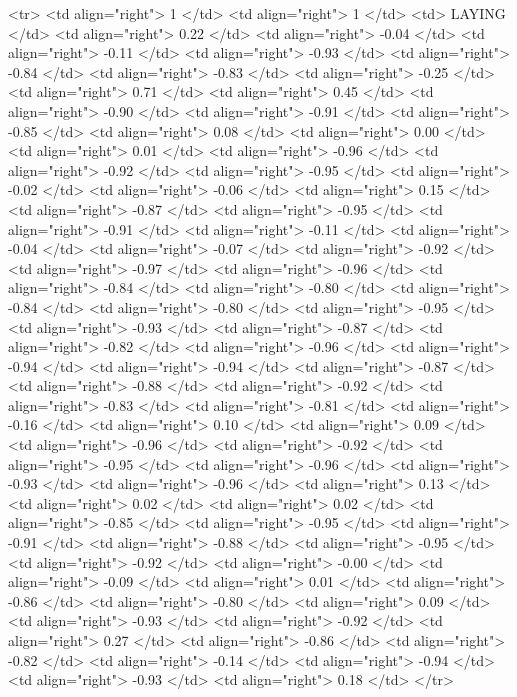  <tr> <td align="right"> 1 </td> <td align="right">   1 </td> <td> LAYING </td> <td align="right"> 0.22 </td> <td align="right"> -0.04 </td> <td align="right"> -0.11 </td> <td align="right"> -0.93 </td> <td align="right"> -0.84 </td> <td align="right"> -0.83 </td> <td align="right"> -0.25 </td> <td align="right"> 0.71 </td> <td align="right"> 0.45 </td> <td align="right"> -0.90 </td> <td align="right"> -0.91 </td> <td align="right"> -0.85 </td> <td align="right"> 0.08 </td> <td align="right"> 0.00 </td> <td align="right"> 0.01 </td> <td align="right"> -0.96 </td> <td align="right"> -0.92 </td> <td align="right"> -0.95 </td> <td align="right"> -0.02 </td> <td align="right"> -0.06 </td> <td align="right"> 0.15 </td> <td align="right"> -0.87 </td> <td align="right"> -0.95 </td> <td align="right"> -0.91 </td> <td align="right"> -0.11 </td> <td align="right"> -0.04 </td> <td align="right"> -0.07 </td> <td align="right"> -0.92 </td> <td align="right"> -0.97 </td> <td align="right"> -0.96 </td> <td align="right"> -0.84 </td> <td align="right"> -0.80 </td> <td align="right"> -0.84 </td> <td align="right"> -0.80 </td> <td align="right"> -0.95 </td> <td align="right"> -0.93 </td> <td align="right"> -0.87 </td> <td align="right"> -0.82 </td> <td align="right"> -0.96 </td> <td align="right"> -0.94 </td> <td align="right"> -0.94 </td> <td align="right"> -0.87 </td> <td align="right"> -0.88 </td> <td align="right"> -0.92 </td> <td align="right"> -0.83 </td> <td align="right"> -0.81 </td> <td align="right"> -0.16 </td> <td align="right"> 0.10 </td> <td align="right"> 0.09 </td> <td align="right"> -0.96 </td> <td align="right"> -0.92 </td> <td align="right"> -0.95 </td> <td align="right"> -0.96 </td> <td align="right"> -0.93 </td> <td align="right"> -0.96 </td> <td align="right"> 0.13 </td> <td align="right"> 0.02 </td> <td align="right"> 0.02 </td> <td align="right"> -0.85 </td> <td align="right"> -0.95 </td> <td align="right"> -0.91 </td> <td align="right"> -0.88 </td> <td align="right"> -0.95 </td> <td align="right"> -0.92 </td> <td align="right"> -0.00 </td> <td align="right"> -0.09 </td> <td align="right"> 0.01 </td> <td align="right"> -0.86 </td> <td align="right"> -0.80 </td> <td align="right"> 0.09 </td> <td align="right"> -0.93 </td> <td align="right"> -0.92 </td> <td align="right"> 0.27 </td> <td align="right"> -0.86 </td> <td align="right"> -0.82 </td> <td align="right"> -0.14 </td> <td align="right"> -0.94 </td> <td align="right"> -0.93 </td> <td align="right"> 0.18 </td> </tr>
